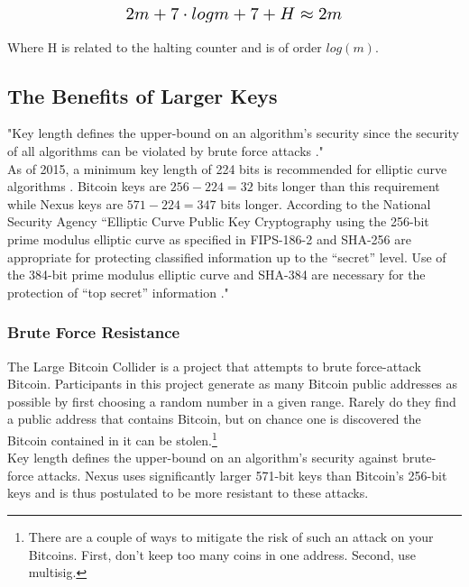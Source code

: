 \documentclass[11pt]{article}
\begin{document}
\begin{equation}
\resizebox{.5\hsize}{!}{$2 m + 7\cdot log m + 7 + H \approx 2m$}
\end{equation}

\noindent Where H is related to the halting counter and is of order $log(m)$.

\subsection{The Benefits of Larger Keys}

"Key length defines the upper-bound on an algorithm's security since the security of all algorithms can be violated by brute force attacks \cite{wikikeysize}." \\ 

\noindent As of 2015, a minimum key length of 224 bits is recommended for elliptic curve algorithms \cite{bruteforce}.
Bitcoin keys are $256-224 = 32$ bits longer than this requirement while Nexus keys are $571-224 = 347$ bits longer.
\noindent According to the National Security Agency 
``Elliptic Curve Public Key Cryptography using the 256-bit prime modulus elliptic curve as specified in FIPS-186-2 and SHA-256 are appropriate for protecting classified information up to the ``secret'' level. 
Use of the 384-bit prime modulus elliptic curve and SHA-384 are necessary for the protection of ``top secret'' information \cite{nsa384}."

\subsubsection*{Brute Force Resistance}

The Large Bitcoin Collider \cite{largebitcoin} is a project that attempts to brute force-attack Bitcoin.
Participants in this project generate as many Bitcoin public addresses as possible by first choosing a random number in a given range.
Rarely do they find a public address that contains Bitcoin, but on chance one is discovered the Bitcoin contained in it can be stolen.\footnote{There are a couple of ways to mitigate the risk of such an attack on your Bitcoins. First, don't keep too many coins in one address. Second, use multisig.}\\

\noindent Key length defines the upper-bound on an algorithm's security \cite{wikikeysize} against brute-force attacks.
Nexus uses significantly larger 571-bit keys than Bitcoin's 256-bit keys and is thus postulated to be more resistant to these attacks.\\ 
\end{document}
